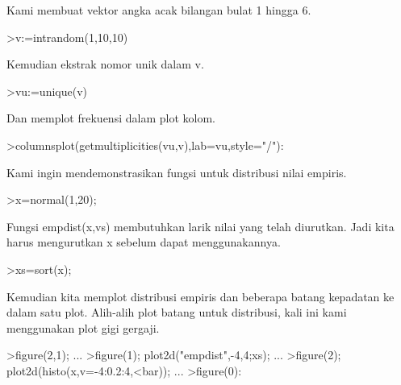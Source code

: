 \documentclass[a4paper,10pt]{article}
\begin{document}
\begin{eulernotebook}
\begin{eulercomment}
\begin{eulercomment}
\begin{eulercomment}
\begin{eulercomment}
\begin{eulercomment}
\begin{eulercomment}
\begin{eulercomment}
\begin{eulercomment}
\begin{eulercomment}
\begin{eulercomment}
\begin{eulercomment}
\begin{eulercomment}
\begin{eulercomment}
\begin{eulercomment}
\begin{eulercomment}
\begin{eulercomment}
\begin{eulercomment}
\begin{eulercomment}
\begin{eulercomment}
Kami membuat vektor angka acak bilangan bulat 1 hingga 6.
\end{eulercomment}
\begin{eulerprompt}
>v:=intrandom(1,10,10)
\end{eulerprompt}
\begin{euleroutput}
  [4,  9,  10,  2,  8,  8,  3,  6,  9,  7]
\end{euleroutput}
\begin{eulercomment}
Kemudian ekstrak nomor unik dalam v.
\end{eulercomment}
\begin{eulerprompt}
>vu:=unique(v)
\end{eulerprompt}
\begin{euleroutput}
  [2,  3,  4,  6,  7,  8,  9,  10]
\end{euleroutput}
\begin{eulercomment}
Dan memplot frekuensi dalam plot kolom.
\end{eulercomment}
\begin{eulerprompt}
>columnsplot(getmultiplicities(vu,v),lab=vu,style="/"):
\end{eulerprompt}
\begin{eulercomment}
Kami ingin mendemonstrasikan fungsi untuk distribusi nilai empiris.
\end{eulercomment}
\begin{eulerprompt}
>x=normal(1,20);
\end{eulerprompt}
\begin{eulercomment}
Fungsi empdist(x,vs) membutuhkan larik nilai yang telah diurutkan.
Jadi kita harus mengurutkan x sebelum dapat menggunakannya.
\end{eulercomment}
\begin{eulerprompt}
>xs=sort(x);
\end{eulerprompt}
\begin{eulercomment}
Kemudian kita memplot distribusi empiris dan beberapa batang kepadatan
ke dalam satu plot. Alih-alih plot batang untuk distribusi, kali ini
kami menggunakan plot gigi gergaji.
\end{eulercomment}
\begin{eulerprompt}
>figure(2,1); ...
>figure(1); plot2d("empdist",-4,4;xs); ...
>figure(2); plot2d(histo(x,v=-4:0.2:4,<bar));  ...
>figure(0):
\end{eulerprompt}

\end{eulercomment}
\end{eulercomment}
\end{eulercomment}
\end{eulercomment}
\end{eulercomment}
\end{eulercomment}
\end{eulercomment}
\end{eulercomment}
\end{eulercomment}
\end{eulercomment}
\end{eulercomment}
\end{eulercomment}
\end{eulercomment}
\end{eulercomment}
\end{eulercomment}
\end{eulercomment}
\end{eulercomment}
\end{eulercomment}
\end{eulernotebook}
\end{document}
